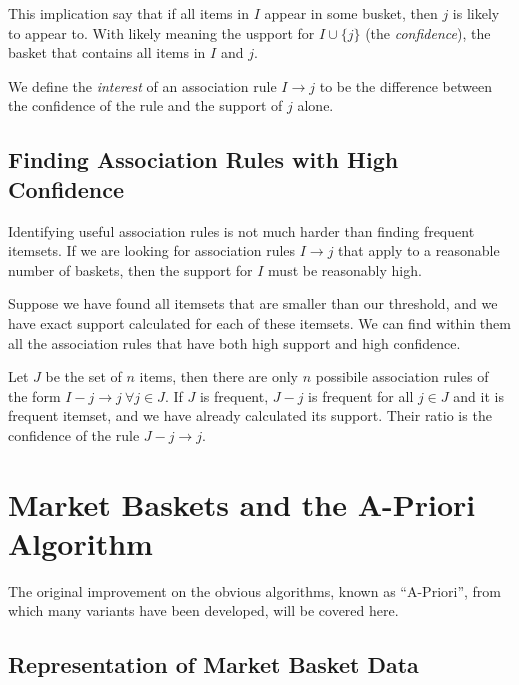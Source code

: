 This implication say that if all items in $I$ appear in some busket, then $j$ is likely to appear to. With likely meaning the uspport for $I \cup \{j\}$ (the \textit{confidence}), the basket that contains all items in $I$ and $j$.

We define the \textit{interest} of an association rule $I \rightarrow j$ to be the difference between the confidence of the rule and the support of $j$ alone.

\subsection{Finding Association Rules with High Confidence}\label{subsec:finding-association-rules-with-high-confidence}

Identifying useful association rules is not much harder than finding frequent itemsets. If we are looking for association rules $I \rightarrow j$ that apply to a reasonable number of baskets, then the support for $I$ must be reasonably high.

Suppose we have found all itemsets that are smaller than our threshold, and we have exact support calculated for each of these itemsets. We can find within them all the association rules that have both high support and high confidence. 

Let $J$ be the set of $n$ items, then there are only $n$ possibile association rules of the form $I - {j}\rightarrow j \  \forall j\in J$. If $J$ is frequent, $J - {j}$ is frequent for all $j \in J$ and it is frequent itemset, and we have already calculated its support. Their ratio is the confidence of the rule $J - {j}\rightarrow j$.

\section{Market Baskets and the A-Priori Algorithm}\label{sec:market-baskets-and-the-a-priori-algorithm}

The original improvement on the obvious algorithms, known as ``A-Priori'', from which many variants have been developed, will be covered here.

\subsection{Representation of Market Basket Data}\label{subsec:representation-of-market-basket-data}














